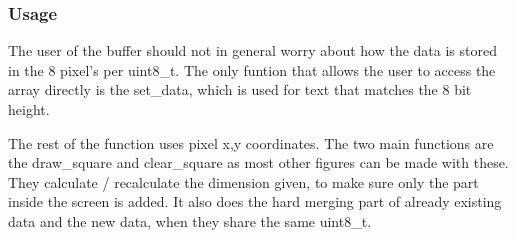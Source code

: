 \subsubsection{Usage}

The user of the buffer should not in general worry about how the data is stored in the 8 pixel's per uint8\_t. The only funtion that allows the user to access the array directly is the set\_data, which is used for text that matches the 8 bit height.

The rest of the function uses pixel x,y coordinates. The two main functions are the draw\_square and clear\_square as most other figures can be made with these. They calculate / recalculate the dimension given, to make sure only the part inside the screen is added. It also does the hard merging part of already existing data and the new data, when they share the same uint8\_t.
